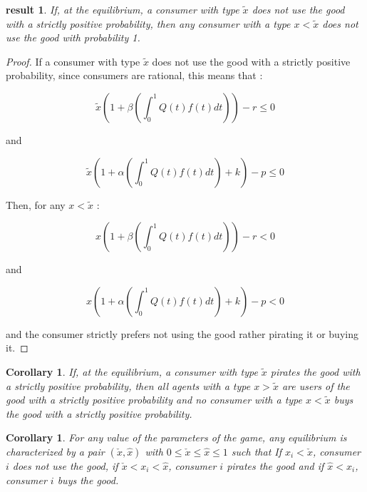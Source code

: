 \documentclass[12pt]{report}
\newtheorem{corollary}[theorem]{Corollary}
\newtheorem{result}{result}
\numberwithin{equation}{section}
\begin{document}
\begin{result}
If, at the equilibrium, a consumer with type $\tilde{x}$ does not use the good with a strictly positive probability, then any consumer with a type $x<\tilde{x}$ does not use the good with probability 1. 
\end{result}

\begin{proof}

If a consumer with type $\tilde{x}$ does not use the good with a strictly positive probability, since consumers are rational, this means that : 

\begin{equation}
\tilde{x}(1+\beta (\int^{1}_{0}Q(t)f(t)dt))-r \leq 0
\end{equation}

and

\begin{equation}
\tilde{x}(1+\alpha (\int^{1}_{0}Q(t)f(t)dt)+k)-p \leq  0 
\end{equation}


Then, for any $x<\tilde{x}$ :

\begin{equation}
x(1+\beta (\int^{1}_{0}Q(t)f(t)dt))-r < 0
\end{equation}

and

\begin{equation}
x(1+\alpha (\int^{1}_{0}Q(t)f(t)dt)+k)-p <  0 
\end{equation}

and the consumer strictly prefers not using the good rather pirating it or buying it.


\end{proof}

\begin{corollary}
If, at the equilibrium, a consumer with type $\tilde{x}$ pirates the good with a strictly positive probability, then all agents with a type $x>\tilde{x}$ are users of the good with a strictly positive probability and no consumer  with a type $x<\tilde{x}$ buys the good with a strictly positive probability.
\end{corollary}

\begin{corollary}
For any value of the parameters of the game, any equilibrium is characterized by a pair $(\check{x},\hat{x})$ with $0\leq \check{x} \leq \hat{x} \leq 1$ such that If $x_i<\check{x}$, consumer $i$ does not use the good, if $\check{x} <x_i <\hat{x}$, consumer $i$ pirates the good and if $\hat{x}<x_i$, consumer $i$ buys the good. 
\end{corollary}
\end{document}
